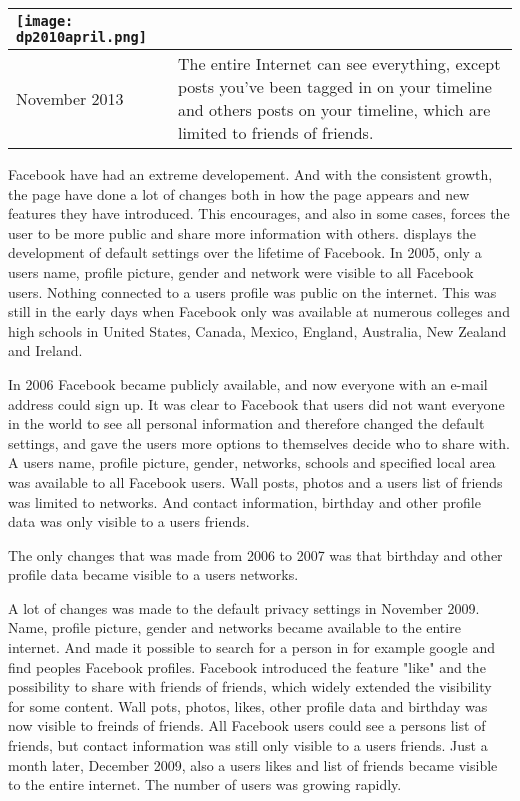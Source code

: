 \begin{center}
\begin{longtable}{ | p{1.3cm} | p{10.6cm} |}
    \texttt{[image: dp2010april.png]} \\
    \hline
    November 2013 & The entire Internet can see everything, except posts you've been tagged in on your timeline and others posts on your timeline, which are limited to friends of friends. \\ 
    \hline
   \end{longtable}
\end{center} 


Facebook have had an extreme developement. And with the consistent growth, the page have done a lot of changes both in how the page appears and new features they have introduced. This encourages, and also in some cases, forces the user to be more public and share more information with others.  displays the development of default settings over the lifetime of Facebook. In 2005, only a users name, profile picture, gender and network were visible to all Facebook users. Nothing connected to a users profile was public on the internet. This was still in the early days when Facebook only was available at numerous colleges and high schools in United States, Canada, Mexico, England, Australia, New Zealand and Ireland.

In 2006 Facebook became publicly available, and now everyone with an e-mail address could sign up. It was clear to Facebook that users did not want everyone in the world to see all personal information and therefore changed the default settings, and gave the users more options to themselves decide who to share with. A users name, profile picture, gender, networks, schools and specified local area was available to all Facebook users. Wall posts, photos and a users list of friends was limited to networks. And contact information, birthday and other profile data was only visible to a users friends. 

The only changes that was made from 2006 to 2007 was that birthday and other profile data became visible to a users networks.

A lot of changes was made to the default privacy settings in November 2009. Name, profile picture, gender and networks became available to the entire internet. And made it possible to search for a person in for example google and find peoples Facebook profiles. Facebook introduced the feature "like" and the possibility to share with friends of friends, which widely extended the visibility for some content. Wall pots, photos, likes, other profile data and birthday was now visible to freinds of friends. All Facebook users could see a persons list of friends, but contact information was still only visible to a users friends. Just a month later, December 2009, also a users likes and list of friends became visible to the entire internet. The number of users was growing rapidly.

